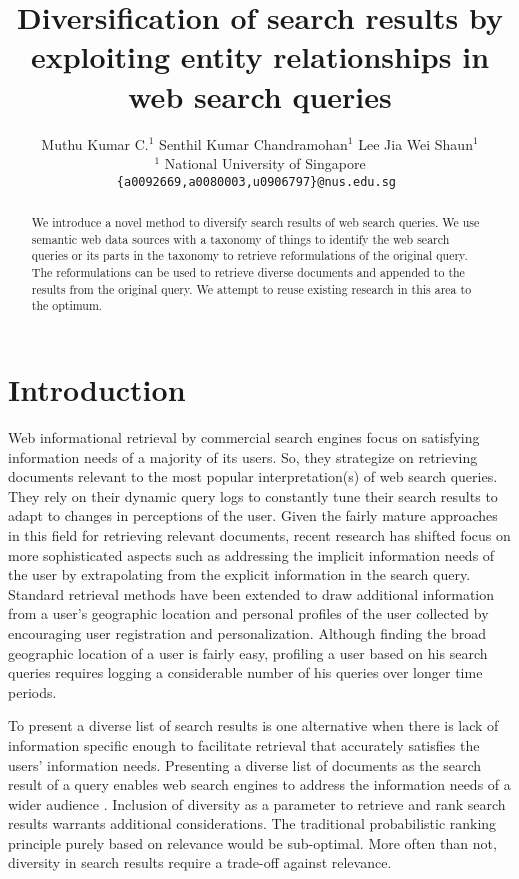 \documentclass[11pt]{article}
\title{Diversification of search results by exploiting entity relationships in
web search queries}
\author{Muthu Kumar C.$^{1}$ \hspace{1.1cm}  Senthil Kumar Chandramohan$^{1}$ \hspace{1.1cm} Lee Jia Wei Shaun$^{1}$ \\
 {$^{1}$ National University of Singapore }\\
 {\tt \{a0092669,a0080003,u0906797\}@nus.edu.sg }%
 }
\date{}
\begin{document}
\maketitle
\begin{abstract}
We introduce a novel method to diversify search results of web 
search queries. We use semantic web data sources with a taxonomy 
of things to identify the web search queries or its parts in the 
taxonomy to retrieve reformulations of the original query. The 
reformulations can be used to retrieve diverse documents and
appended to the results from the original query. We attempt to 
reuse existing research in this area to the optimum.
\end{abstract}


\section{Introduction}
\label{intro}
Web informational retrieval by commercial search engines focus on 
satisfying information needs of a majority of its users. So, they 
strategize on retrieving documents relevant to the most popular interpretation(s) 
of web search queries. They rely on their dynamic query logs to constantly tune 
their search results to adapt to changes in perceptions of the user. Given 
the fairly mature approaches in this field for retrieving relevant documents, 
recent research has shifted focus on more sophisticated aspects such as addressing 
the implicit information needs of the user by extrapolating from the explicit 
information in the search query. Standard retrieval methods have been extended to 
draw additional information from a user's geographic location \cite{lu2010personalize} 
and personal profiles of the user \cite{teevan2005personalizing} collected by 
encouraging user registration and personalization. Although finding the broad 
geographic location of a user is fairly easy, profiling a user based on his search 
queries requires logging a considerable number of his queries over longer time periods.

To present a diverse list of search results is one alternative when there is lack 
of information specific enough to facilitate retrieval that accurately satisfies the 
users' information needs. Presenting a diverse list of documents as the search result 
of a query enables web search engines to address the information needs of a wider 
audience \cite{bhatia2012analysis}. Inclusion of diversity as a parameter to retrieve 
and rank search results warrants additional considerations. The traditional probabilistic 
ranking principle purely based on relevance would be sub-optimal\cite{gollapudi2009axiomatic}. 
More often than not, diversity in search results require a trade-off against relevance.
\end{document}
